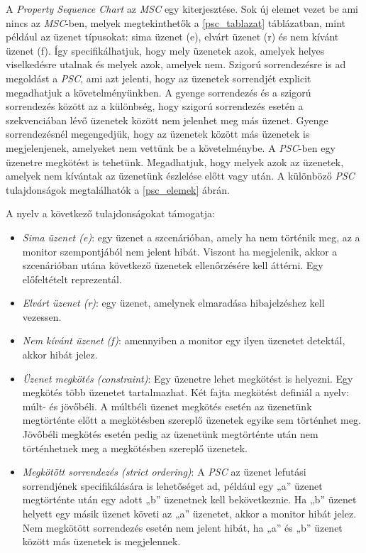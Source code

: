 A \textit{Property Sequence Chart} \cite{PSC1} az \textit{MSC} egy kiterjesztése.
Sok új elemet vezet be ami nincs az \textit{MSC}-ben, melyek megtekinthetők a \ref{psc_tablazat} táblázatban, mint például az üzenet típusokat: sima üzenet (e), elvárt üzenet (r) és nem kívánt üzenet (f).
Így specifikálhatjuk, hogy mely üzenetek azok, amelyek helyes viselkedésre utalnak és melyek azok, amelyek nem.
Szigorú sorrendezésre is ad megoldást a \textit{PSC}, ami azt jelenti, hogy az üzenetek sorrendjét explicit megadhatjuk a követelményünkben.
A gyenge sorrendezés és a szigorú sorrendezés között az a különbség, hogy szigorú sorrendezés esetén a szekvenciában lévő üzenetek között nem jelenhet meg más üzenet.
Gyenge sorrendezésnél megengedjük, hogy az üzenetek között más üzenetek is megjelenjenek, amelyeket nem vettünk be a követelménybe.
A \textit{PSC}-ben egy üzenetre megkötést is tehetünk.
Megadhatjuk, hogy melyek azok az üzenetek, amelyek nem kívántak az üzenetünk észlelése előtt vagy után.
A különböző \textit{PSC} tulajdonságok megtalálhatók a \ref{psc_elemek} ábrán.

A nyelv a következő tulajdonságokat támogatja:
\begin{itemize}
    \item \textit{Sima üzenet (e)}: egy üzenet a szcenárióban, amely ha nem történik meg, az a monitor szempontjából nem jelent hibát.
    Viszont ha megjelenik, akkor a szcenárióban utána következő üzenetek ellenőrzésére kell áttérni.
    Egy előfeltételt reprezentál.
    \item \textit{Elvárt üzenet (r)}: egy üzenet, amelynek elmaradása hibajelzéshez kell vezessen.
    \item \textit{Nem kívánt üzenet (f)}: amennyiben a monitor egy ilyen üzenetet detektál, akkor hibát jelez.
    \item \textit{Üzenet megkötés (constraint)}: Egy üzenetre lehet megkötést is helyezni.
    Egy megkötés több üzenetet tartalmazhat.
    Két fajta megkötést definiál a nyelv: múlt- és jövőbéli.
    A múltbéli üzenet megkötés esetén az üzenetünk megtörténte előtt a megkötésben szereplő üzenetek egyike sem történhet meg.
    Jövőbéli megkötés esetén pedig az üzenetünk megtörténte után nem történhetnek meg a megkötésben szereplő üzenetek.
    \item \textit{Megkötött sorrendezés (strict ordering)}: A \textit{PSC} az üzenet lefutási sorrendjének specifikálására is lehetőséget ad, például egy „a” üzenet megtörténte után egy adott „b” üzenetnek kell bekövetkeznie.
    Ha „b” üzenet helyett egy másik üzenet követi az „a” üzenetet, akkor a monitor hibát jelez.
    Nem megkötött sorrendezés esetén nem jelent hibát, ha „a” és „b” üzenet között más üzenetek is megjelennek.
\end{itemize}

